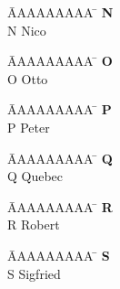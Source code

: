 \documentclass[a4paper, fleqn, headsepline, footsepline, 12pt, parskip=half]{scrartcl}
\begin{document}
\vspace*{-1.5cm}
\begin{tabbing}
	\hspace{0.0cm}  \= AAAAAAAAA \=       \hspace{2cm} \kill
	\>\textbf{N} 	\> \\
	\>N 			\>  Nico\\
\end{tabbing}

\vspace*{-1.5cm}
\begin{tabbing}
	\hspace{0.0cm}  \= AAAAAAAAA \=       \hspace{2cm} \kill
	\>\textbf{O} 	\> \\
	\>O 			\>  Otto\\
\end{tabbing}

\vspace*{-1.5cm}
\begin{tabbing}
	\hspace{0.0cm}  \= AAAAAAAAA \=       \hspace{2cm} \kill
	\>\textbf{P} 	\> \\
	\>P 			\>  Peter\\
\end{tabbing}

\vspace*{-1.5cm}
\begin{tabbing}
	\hspace{0.0cm}  \= AAAAAAAAA \=       \hspace{2cm} \kill
	\>\textbf{Q} 	\> \\
	\>Q 			\>  Quebec\\
\end{tabbing}

\vspace*{-1.5cm}
\begin{tabbing}
	\hspace{0.0cm}  \= AAAAAAAAA \=       \hspace{2cm} \kill
	\>\textbf{R} 	\> \\
	\>R 			\>  Robert\\
\end{tabbing}

\vspace*{-1.5cm}
\begin{tabbing}
	\hspace{0.0cm}  \= AAAAAAAAA \=       \hspace{2cm} \kill
	\>\textbf{S} 	\> \\
	\>S 			\>  Sigfried\\
\end{tabbing}
\end{document}
